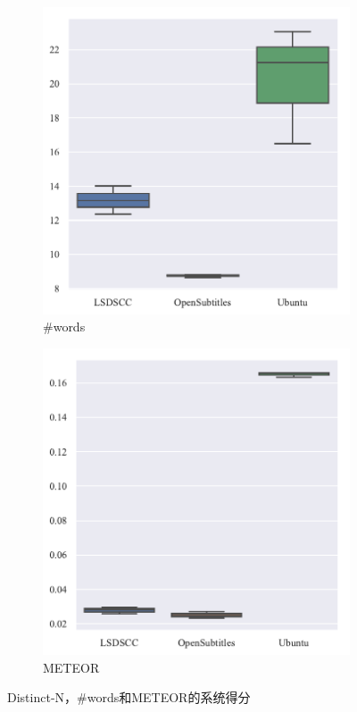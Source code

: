 \begin{figure}[H]
    \begin{subfigure}{0.5\linewidth}
        \centering
        \includegraphics[width=\linewidth]{figure/boxplot/dataset/utterance_len/plot.pdf}
        \caption{\#words}
        \label{fig:words_system}
    \end{subfigure}%
    \begin{subfigure}{0.5\linewidth}
        \centering
        \includegraphics[width=\linewidth]{figure/boxplot/dataset/meteor/plot.pdf}
        \caption{METEOR}
        \label{fig:meteor_system}
    \end{subfigure}
    \caption{Distinct-N，\#words和METEOR的系统得分}
    \label{fig:Other_system}
\end{figure}
